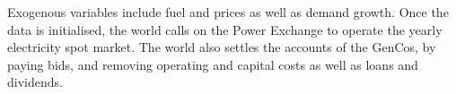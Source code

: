 Exogenous variables include fuel and  prices as well as demand growth. Once the data is initialised, the world calls on the Power Exchange to operate the yearly electricity spot market. The world also settles the accounts of the GenCos, by paying bids, and removing operating and capital costs as well as loans and dividends.

















